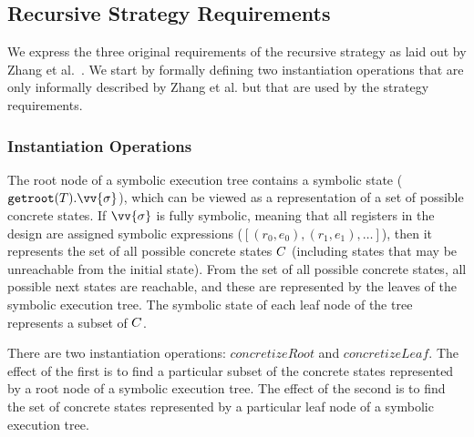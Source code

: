 \subsection{Recursive Strategy Requirements}
We express the three original requirements of the recursive strategy as
laid out by Zhang et al.~\cite{zhang2018recursive}. 
We start by formally defining two instantiation operations that are only informally described
by Zhang et al. but that are used by the strategy requirements.

\subsubsection{Instantiation Operations} 

The root node of a symbolic execution tree \tree{} contains a symbolic state
  ($\mathtt{getroot}(\tree).\vv{\symstate}$), which can be viewed as a representation of
  a set of possible concrete states. If $\vv{\symstate}$ is fully symbolic, meaning
  that all registers in the design are assigned symbolic expressions ($[(r_0,e_0),(r_1,e_1),\ldots]$), then it represents the set of all
  possible concrete states $C$ (including states that may be
  unreachable from the initial state). From the set of all possible concrete
  states, all possible next states are reachable, and these are represented by
  the leaves of the symbolic execution tree. The symbolic state of each leaf node of the tree
  represents a subset of $C$.

  There are two instantiation operations: $\mathit{concretizeRoot}$ and
  $\mathit{concretizeLeaf}$. The effect of the first is to find a particular
  subset of the concrete states represented by a root node of a symbolic
  execution tree. The effect of the second is to find the set of concrete states
  represented by a particular leaf node of a symbolic execution tree. 



